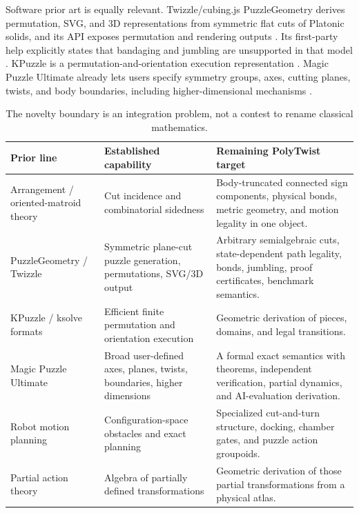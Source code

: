 \documentclass[11pt,openany]{book}
\theoremstyle{polyplain}
\theoremstyle{polydef}
\begin{document}
Software prior art is equally relevant. Twizzle/cubing.js PuzzleGeometry derives permutation, SVG, and 3D representations from symmetric flat cuts of Platonic solids, and its API exposes permutation and rendering outputs \parencite{CubingJSPuzzleGeometry2026,TwizzleExplorer2026}. Its first-party help explicitly states that bandaging and jumbling are unsupported in that model \parencite{TwizzleExplorer2026}. KPuzzle is a permutation-and-orientation execution representation \parencite{CubingJSKPuzzle2026}. Magic Puzzle Ultimate already lets users specify symmetry groups, axes, cutting planes, twists, and body boundaries, including higher-dimensional mechanisms \parencite{MagicPuzzleUltimate2026}.

\begin{table}[htbp]
\centering
\small
\begin{tabularx}{\textwidth}{L{0.20\textwidth}L{0.30\textwidth}Y}
\toprule
\textbf{Prior line} & \textbf{Established capability} & \textbf{Remaining PolyTwist target}\\
\midrule
Arrangement / oriented-matroid theory & Cut incidence and combinatorial sidedness & Body-truncated connected sign components, physical bonds, metric geometry, and motion legality in one object.\\
PuzzleGeometry / Twizzle & Symmetric plane-cut puzzle generation, permutations, SVG/3D output & Arbitrary semialgebraic cuts, state-dependent path legality, bonds, jumbling, proof certificates, benchmark semantics.\\
KPuzzle / ksolve formats & Efficient finite permutation and orientation execution & Geometric derivation of pieces, domains, and legal transitions.\\
Magic Puzzle Ultimate & Broad user-defined axes, planes, twists, boundaries, higher dimensions & A formal exact semantics with theorems, independent verification, partial dynamics, and AI-evaluation derivation.\\
Robot motion planning & Configuration-space obstacles and exact planning & Specialized cut-and-turn structure, docking, chamber gates, and puzzle action groupoids.\\
Partial action theory & Algebra of partially defined transformations & Geometric derivation of those partial transformations from a physical atlas.\\
\bottomrule
\end{tabularx}
\caption{The novelty boundary is an integration problem, not a contest to rename classical mathematics.}
\label{tab:prior-art}
\end{table}
\end{document}
